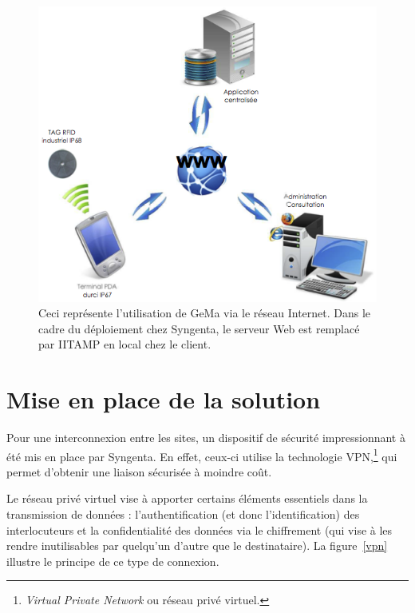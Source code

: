 \begin{figure}
  \begin{center}
    \includegraphics[scale=1.5]{images/gema.png}
    \caption{Ceci représente l'utilisation de GeMa via le réseau
    Internet. Dans le cadre du déploiement chez Syngenta, le serveur Web
    est remplacé par IITAMP en local chez le client.}
    \label{gema}
  \end{center}
\end{figure}

\section{Mise en place de la solution} %
\label{sec:Mise en place de la solution}

Pour une interconnexion entre les sites, un dispositif de sécurité
impressionnant à été mis en place par Syngenta. En effet, ceux-ci
utilise la technologie VPN,\footnote{\emph{Virtual Private Network} ou
réseau privé virtuel.} qui permet d'obtenir une liaison sécurisée à
moindre coût.

Le réseau privé virtuel vise à apporter certains éléments essentiels
dans la transmission de données : l'authentification (et donc
l'identification) des interlocuteurs et la confidentialité des données
via le chiffrement (qui vise à les rendre inutilisables par quelqu'un
d'autre que le destinataire). La figure~\ref{vpn} illustre le principe
de ce type de connexion.


